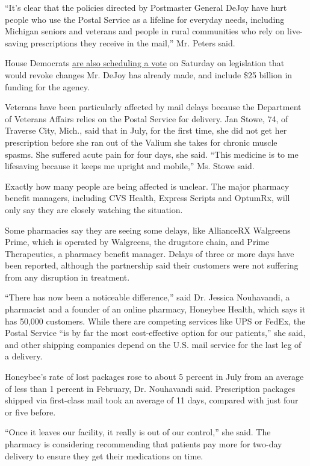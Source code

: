 ``It's clear that the policies directed by Postmaster General DeJoy have
hurt people who use the Postal Service as a lifeline for everyday needs,
including Michigan seniors and veterans and people in rural communities
who rely on live-saving prescriptions they receive in the mail,'' Mr.
Peters said.

House Democrats
\href{https://www.nytimes3xbfgragh.onion/2020/08/16/us/politics/coronavirus-postal-service-stimulus-bill.html}{are
also scheduling a vote} on Saturday on legislation that would revoke
changes Mr. DeJoy has already made, and include \$25 billion in funding
for the agency.

Veterans have been particularly affected by mail delays because the
Department of Veterans Affairs relies on the Postal Service for
delivery. Jan Stowe, 74, of Traverse City, Mich., said that in July, for
the first time, she did not get her prescription before she ran out of
the Valium she takes for chronic muscle spasms. She suffered acute pain
for four days, she said. ``This medicine is to me lifesaving because it
keeps me upright and mobile,'' Ms. Stowe said.

Exactly how many people are being affected is unclear. The major
pharmacy benefit managers, including CVS Health, Express Scripts and
OptumRx, will only say they are closely watching the situation.

Some pharmacies say they are seeing some delays, like AllianceRX
Walgreens Prime, which is operated by Walgreens, the drugstore chain,
and Prime Therapeutics, a pharmacy benefit manager. Delays of three or
more days have been reported, although the partnership said their
customers were not suffering from any disruption in treatment.

``There has now been a noticeable difference,'' said Dr. Jessica
Nouhavandi, a pharmacist and a founder of an online pharmacy, Honeybee
Health, which says it has 50,000 customers. While there are competing
services like UPS or FedEx, the Postal Service ``is by far the most
cost-effective option for our patients,'' she said, and other shipping
companies depend on the U.S. mail service for the last leg of a
delivery.

Honeybee's rate of lost packages rose to about 5 percent in July from an
average of less than 1 percent in February, Dr. Nouhavandi said.
Prescription packages shipped via first-class mail took an average of 11
days, compared with just four or five before.

``Once it leaves our facility, it really is out of our control,'' she
said. The pharmacy is considering recommending that patients pay more
for two-day delivery to ensure they get their medications on time.

